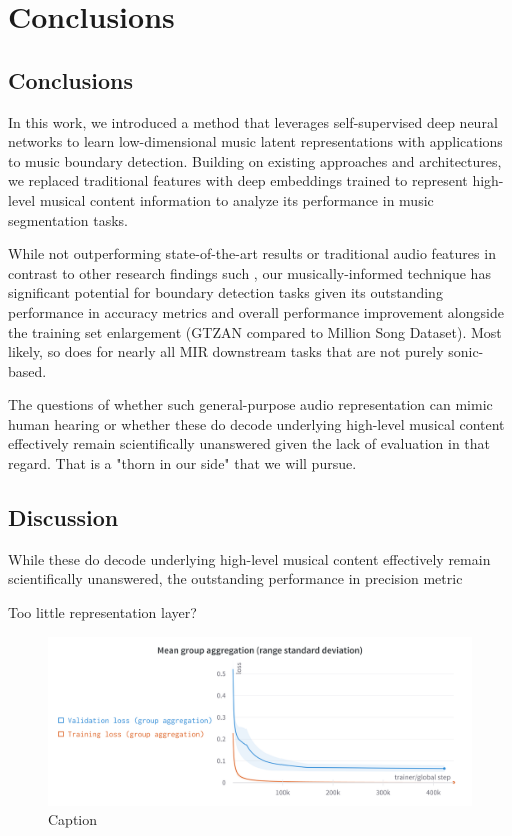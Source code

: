 \chapter{Conclusions}

\section{Conclusions}

In this work, we introduced a method that leverages self-supervised deep neural networks to learn low-dimensional music latent representations with applications to music boundary detection. Building on existing approaches and architectures, we replaced traditional features with deep embeddings trained to represent high-level musical content information to analyze its performance in music segmentation tasks.

While not outperforming state-of-the-art results or traditional audio features in contrast to other research findings such \cite{deepfeaturesegment, SalamonDeepSegmentation}, our musically-informed technique has significant potential for boundary detection tasks given its outstanding performance in accuracy metrics and overall performance improvement alongside the training set enlargement (GTZAN compared to Million Song Dataset). Most likely, so does for nearly all MIR downstream tasks that are not purely sonic-based.

The questions of whether such general-purpose audio representation can mimic human hearing \cite{Li2023MERT:Training, Turian2022HEAR:Representations} or whether these do decode underlying high-level musical content effectively remain scientifically unanswered given the lack of evaluation in that regard. That is a "thorn in our side" that we will pursue.

\section{Discussion}

While these do decode underlying high-level musical content effectively remain scientifically unanswered, the outstanding performance in precision metric

Too little representation layer?

\begin{figure}
    \centering
    \includegraphics[width=\textwidth]{figures/images/Mean group aggregation.png}
    \caption{Caption}
    \label{fig:enter-label}
\end{figure}



\newpage


